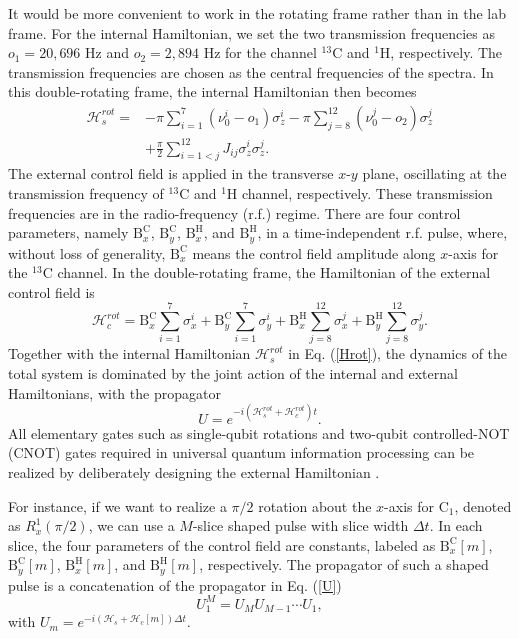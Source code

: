 \documentclass[twocolumn,reprint, amsmath,amssymb,showpacs,superscriptaddress]{revtex4-1}
\newcommand{\be}{\begin{equation}}
\newcommand{\ee}{\end{equation}}
\begin{document}
It would be more convenient to work in the rotating frame rather than in the lab frame. For the internal Hamiltonian, we set the two transmission frequencies as $o_1 = 20,696$ Hz and $o_2 = 2,894$ Hz for the channel $^{13}$C and $^1$H, respectively. The transmission frequencies are chosen as the central frequencies of the spectra. In this double-rotating frame, the internal Hamiltonian then becomes
\begin{align}
\mathcal{H}_{s}^{rot} = {} &  -\pi\sum_{i=1}^{7} \left( \nu^i_0-o_1\right) \sigma_z^{i} -\pi\sum_{j=8}^{12} \left( \nu^j_0-o_2\right) \sigma_z^{j}  \nonumber \\
{} & + \frac{\pi}{2}\sum_{i=1<j}^{12} J_{ij} \sigma_z^{i}\sigma_z^{j}.
\label{Hrot}
\end{align}
The external control field is applied in the transverse $x$-$y$ plane,   oscillating at the transmission frequency of $^{13}$C and $^1$H channel, respectively. These transmission frequencies are in the radio-frequency (r.f.) regime. There are four control parameters, namely $\text{B}_x^\text{C}$, $\text{B}_y^\text{C}$, $\text{B}_x^\text{H}$, and $\text{B}_y^\text{H}$, in a time-independent r.f. pulse, where, without loss of generality, $\text{B}_x^\text{C}$ means the control field amplitude along $x$-axis for the $^{13}$C channel. In the double-rotating frame, the Hamiltonian of the external control field is
\be
\mathcal{H}_{c}^{rot} =  \text{B}_x^\text{C}\sum_{i=1}^7 \sigma_x^i + \text{B}_y^\text{C}\sum_{i=1}^7 \sigma_y^i+\text{B}_x^\text{H}\sum_{j=8}^{12} \sigma_x^j + \text{B}_y^\text{H}\sum_{j=8}^{12} \sigma_y^j.
\label{Hext}
\ee
Together with the internal Hamiltonian $\mathcal{H}_{s}^{rot}$ in Eq. (\ref{Hrot}), the dynamics of the total system is dominated by the joint action of the internal and external Hamiltonians, with the propagator
\be
U = e^{-i\left( \mathcal{H}_{s}^{rot}+\mathcal{H}_{c}^{rot}\right)t}.
\label{U}
\ee
All elementary gates such as single-qubit rotations and two-qubit controlled-NOT (CNOT) gates required in universal quantum information processing can be realized by deliberately designing the external Hamiltonian \cite{vandersypen2005nmr}.






For instance, if we want to realize a $\pi/2$ rotation about the $x$-axis for C$_1$, denoted as $R_x^1\left( \pi/2 \right)$, we can use a $M$-slice shaped pulse with slice width $\Delta t$. In each slice, the four parameters of the control field are constants, labeled as $\text{B}_x^\text{C}[m]$, $\text{B}_y^\text{C}[m]$, $\text{B}_x^\text{H}[m]$, and $\text{B}_y^\text{H}[m]$, respectively. The propagator of such a shaped pulse is a concatenation of the propagator in Eq. (\ref{U})
\be
U_{1}^{M} = U_MU_{M-1}\cdots U_{1},
\label{Um2}
\ee
with $U_m = e^{-i(\mathcal{H}_{s}+\mathcal{H}_{c}[m])\Delta t}$.
\end{document}
